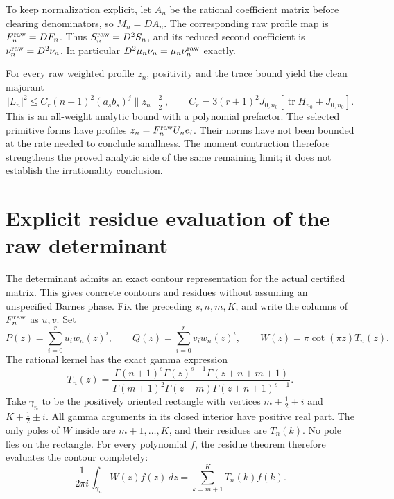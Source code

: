 \documentclass[11pt]{article}
\theoremstyle{remark}
\begin{document}
To keep normalization explicit, let \(A_n\) be the rational coefficient
matrix before clearing denominators, so \(M_n=DA_n\). The corresponding
raw profile map is \(F_n^{\rm raw}=DF_n\). Thus
\(S_n^{\rm raw}=D^2S_n\), and its reduced second coefficient is
\(\nu_n^{\rm raw}=D^2\nu_n\). In particular
\(D^2\mu_n\nu_n=\mu_n\nu_n^{\rm raw}\) exactly.

For every raw weighted profile \(z_n\), positivity and the trace bound yield
the clean majorant
\[
 |L_n|^2\le C_r(n+1)^2(a_sb_s)^j\|z_n\|_2^2,\qquad
 C_r=3(r+1)^2J_{0,n_0}
       [\operatorname{tr}H_{n_0}+J_{0,n_0}].
\]
This is an all-weight analytic bound with a polynomial prefactor.
The selected primitive forms have profiles
\(z_n=F_n^{\rm raw}U_ne_i\). Their norms have not been bounded at the
rate needed to conclude smallness. The moment contraction therefore
strengthens the proved analytic side of the same remaining limit;
it does not establish the irrationality conclusion.

\section{Explicit residue evaluation of the raw determinant}
The determinant admits an exact contour representation for the actual
certified matrix. This gives concrete contours and residues without
assuming an unspecified Barnes phase. Fix the preceding \(s,n,m,K\),
and write the columns of \(F_n^{\rm raw}\) as \(u,v\). Set
\[
 P(z)=\sum_{i=0}^r u_i w_n(z)^i,\qquad
 Q(z)=\sum_{i=0}^r v_i w_n(z)^i,\qquad
 W(z)=\pi\cot(\pi z)T_n(z).
\]
The rational kernel has the exact gamma expression
\[
 T_n(z)=
 \frac{\Gamma(n+1)^s\Gamma(z)^{s+1}\Gamma(z+n+m+1)}
 {\Gamma(m+1)^2\Gamma(z-m)\Gamma(z+n+1)^{s+1}}.
\]
Take \(\gamma_n\) to be the positively oriented rectangle with vertices
\(m+\tfrac12\pm i\) and \(K+\tfrac12\pm i\). All gamma arguments
in its closed interior have positive real part. The only poles of
\(W\) inside are \(m+1,\ldots,K\), and their residues are \(T_n(k)\).
No pole lies on the rectangle. For every polynomial \(f\), the residue
theorem therefore evaluates the contour completely:
\[
 \frac1{2\pi i}\int_{\gamma_n}W(z)f(z)\,dz
       =\sum_{k=m+1}^K T_n(k)f(k).
\]
\end{document}

